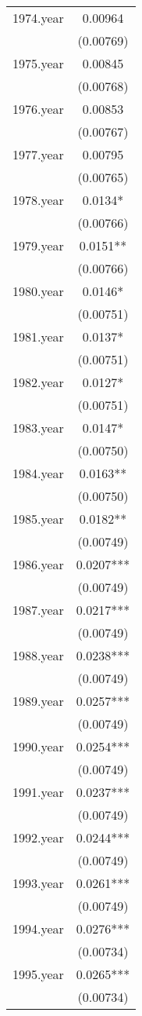 \documentclass[]{article}
\begin{document}
\begin{tabular}{lc}
1974.year & 0.00964 \\
 & (0.00769) \\
1975.year & 0.00845 \\
 & (0.00768) \\
1976.year & 0.00853 \\
 & (0.00767) \\
1977.year & 0.00795 \\
 & (0.00765) \\
1978.year & 0.0134* \\
 & (0.00766) \\
1979.year & 0.0151** \\
 & (0.00766) \\
1980.year & 0.0146* \\
 & (0.00751) \\
1981.year & 0.0137* \\
 & (0.00751) \\
1982.year & 0.0127* \\
 & (0.00751) \\
1983.year & 0.0147* \\
 & (0.00750) \\
1984.year & 0.0163** \\
 & (0.00750) \\
1985.year & 0.0182** \\
 & (0.00749) \\
1986.year & 0.0207*** \\
 & (0.00749) \\
1987.year & 0.0217*** \\
 & (0.00749) \\
1988.year & 0.0238*** \\
 & (0.00749) \\
1989.year & 0.0257*** \\
 & (0.00749) \\
1990.year & 0.0254*** \\
 & (0.00749) \\
1991.year & 0.0237*** \\
 & (0.00749) \\
1992.year & 0.0244*** \\
 & (0.00749) \\
1993.year & 0.0261*** \\
 & (0.00749) \\
1994.year & 0.0276*** \\
 & (0.00734) \\
1995.year & 0.0265*** \\
 & (0.00734) \\

\end{tabular}
\end{document}
